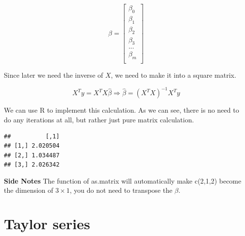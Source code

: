 \documentclass[]{book}
\newenvironment{Shaded}{\begin{snugshade}}{\end{snugshade}}
\newcommand{\CommentTok}[1]{\textcolor[rgb]{0.56,0.35,0.01}{\textit{#1}}}
\newcommand{\DataTypeTok}[1]{\textcolor[rgb]{0.13,0.29,0.53}{#1}}
\newcommand{\DecValTok}[1]{\textcolor[rgb]{0.00,0.00,0.81}{#1}}
\newcommand{\KeywordTok}[1]{\textcolor[rgb]{0.13,0.29,0.53}{\textbf{#1}}}
\newcommand{\NormalTok}[1]{#1}
\newcommand{\OperatorTok}[1]{\textcolor[rgb]{0.81,0.36,0.00}{\textbf{#1}}}
\begin{document}
\[\beta = \begin{bmatrix}\beta_0 \\
\beta_1 \\
\beta_2 \\
\beta_3 \\
...\\
\beta_m \\
\end{bmatrix}\]

Since later we need the inverse of \(X\), we need to make it into a square matrix.

\[X^Ty=X^TX \hat{\beta} \Rightarrow \hat{\beta} = (X^TX)^{-1} X^Ty\]

We can use R to implement this calculation. As we can see, there is no need to do any iterations at all, but rather just pure matrix calculation.

\begin{Shaded}
\end{Shaded}

\begin{verbatim}
##          [,1]
## [1,] 2.020504
## [2,] 1.034487
## [3,] 2.026342
\end{verbatim}

\textbf{Side Notes}
The function of as.matrix will automatically make c(2,1,2) become the dimension of \(3 \times 1\), you do not need to transpose the \(\beta\).

\hypertarget{taylor-series}{%
\section{Taylor series}\label{taylor-series}}
\end{document}

